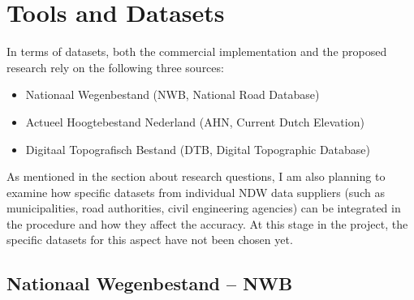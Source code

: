 
\chapter{Tools and Datasets}
\label{chap:td}

In terms of datasets, both the commercial implementation and the proposed research rely on the following three sources:

\begin{itemize}
\item Nationaal Wegenbestand (NWB, National Road Database)
\item Actueel Hoogtebestand Nederland (AHN, Current Dutch Elevation)
\item Digitaal Topografisch Bestand (DTB, Digital Topographic Database)
\end{itemize}

As mentioned in the section about research questions, I am also planning to examine how specific datasets from individual NDW data suppliers (such as municipalities, road authorities, civil engineering agencies) can be integrated in the procedure and how they affect the accuracy. At this stage in the project, the specific datasets for this aspect have not been chosen yet.

\section*{Nationaal Wegenbestand – NWB}

